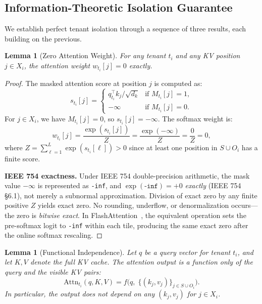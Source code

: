 \documentclass[11pt]{article}
\newtheorem{lemma}[theorem]{Lemma}
\begin{document}
\subsection{Information-Theoretic Isolation Guarantee}
\label{sec:formal:isolation}

We establish perfect tenant isolation through a sequence of three results, each building
on the previous.

\begin{lemma}[Zero Attention Weight]
\label{lem:zero-weight}
For any tenant $t_i$ and any KV position $j \in X_i$, the attention weight
$w_{t_i}[j] = 0$ exactly.
\end{lemma}

\begin{proof}
The masked attention score at position $j$ is computed as:
\begin{equation}
    s_{t_i}[j] = \begin{cases}
        q_{t_i}^\top k_j / \sqrt{d_k} & \text{if } M_{t_i}[j] = 1, \\
        -\infty & \text{if } M_{t_i}[j] = 0.
    \end{cases}
\end{equation}
For $j \in X_i$, we have $M_{t_i}[j] = 0$, so $s_{t_i}[j] = -\infty$.
The softmax weight is:
\begin{equation}
    w_{t_i}[j] = \frac{\exp(s_{t_i}[j])}{Z} = \frac{\exp(-\infty)}{Z} = \frac{0}{Z} = 0,
\end{equation}
where $Z = \sum_{\ell=1}^{L} \exp(s_{t_i}[\ell]) > 0$ since at least one position
in $S \cup O_i$ has a finite score.

\medskip
\noindent\textbf{IEEE 754 exactness.}
Under IEEE 754 double-precision arithmetic, the mask value $-\infty$ is represented as
\texttt{-inf}, and $\exp(\texttt{-inf}) = +0$ \emph{exactly} (IEEE 754 \S6.1), not merely
a subnormal approximation. Division of exact zero by any finite positive $Z$ yields exact
zero. No rounding, underflow, or denormalization occurs---the zero is \emph{bitwise exact}.
In FlashAttention~\cite{dao2022flashattention}, the equivalent operation sets the
pre-softmax logit to \texttt{-inf} within each tile, producing the same exact zero
after the online softmax rescaling.
\end{proof}

\begin{lemma}[Functional Independence]
\label{lem:functional-independence}
Let $q$ be a query vector for tenant $t_i$, and let $K, V$ denote the full KV cache.
The attention output is a function only of the query and the visible KV pairs:
\begin{equation}
    \mathrm{Attn}_{t_i}(q, K, V) = f\!\big(q,\; \{(k_j, v_j)\}_{j \in S \cup O_i}\big).
\end{equation}
In particular, the output does not depend on any $(k_j, v_j)$ for $j \in X_i$.
\end{lemma}
\end{document}
